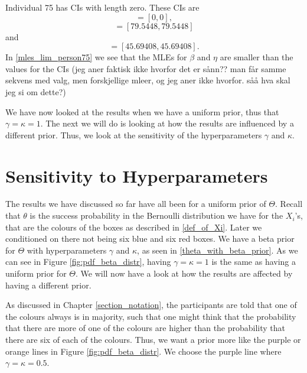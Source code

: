 Individual 75 has CIs with length zero. These CIs are
\begin{equation*}
    [\hat{\alpha}^{*(5)}_{1000},\hat{\alpha}^{*(95)}_{1000}] = [0,0],
\end{equation*}
\begin{equation*}
    [\hb^{*(5)}_{1000},\hb^{*(95)}_{1000}] = [79.5448,79.5448]
\end{equation*}
and
\begin{equation*}
    [\hat{\eta}^{*(5)}_{1000},\hat{\eta}^{*(95)}_{1000}] = [45.69408,45.69408].
\end{equation*}
In \eqref{mles_lim_person75} we see that the MLEs for $\beta$ and $\eta$ are smaller than the values for the CIs (jeg aner faktisk ikke hvorfor det er sånn?? man får samme sekvens med valg, men forskjellige mleer, og jeg aner ikke hvorfor. såå hva skal jeg si om dette?)

We have now looked at the results when we have a uniform prior, thus that $\gamma=\kappa =1$. The next we will do is looking at how the results are influenced by a different prior. Thus, we look at the sensitivity of the hyperparameters $\gamma$ and $\kappa$.




\section{Sensitivity to Hyperparameters}
The results we have discussed so far have all been for a uniform prior of $\Theta$. 
Recall that $\theta$ is the success probability in the Bernoulli distribution we have for the $X_i$'s, that are the colours of the boxes as described in \eqref{def_of_Xi}. Later we conditioned on there not being six blue and six red boxes. We have a beta prior for $\Theta$ with hyperparameters $\gamma$ and $\kappa$, as seen in \eqref{theta_with_beta_prior}. As we can see in Figure \ref{fig:pdf_beta_distr}, having $\gamma=\kappa=1$ is the same as having a uniform prior for $\Theta$. We will now have a look at how the results are affected by having a different prior. 

As discussed in Chapter \ref{section_notation}, the participants are told that one of the colours always is in majority, such that one might think that the probability that there are more of one of the colours are higher than the probability that there are six of each of the colours. Thus, we want a prior more like the purple or orange lines in Figure \ref{fig:pdf_beta_distr}. We choose the purple line where $\gamma=\kappa=0.5$.


